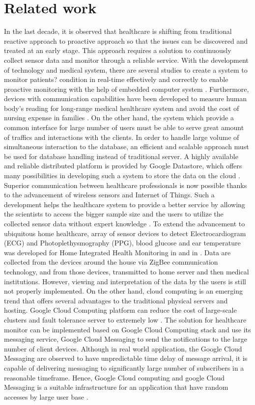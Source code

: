 \section{Related work}
In the last decade, it is observed that healthcare is shifting from traditional reactive approach to proactive approach so
that the issues can be discovered and treated at an early stage. This approach requires a solution to continuously
collect sensor data and monitor through a reliable service.  With the development of technology and medical system,
there are several studies to create a system to monitor patients? condition in real-time effectively and correctly to
enable proactive monitoring \cite{5076774} with the help of embedded computer system \cite{4062461}. Furthermore,
devices with communication capabilities have been developed to measure human body's reading for long-range medical
healthcare system and avoid the cost of nursing expense in families \cite{5918041}. On the other hand, the system which
provide a common interface for large number of users must be able to serve great amount of traffics and interactions
with the clients.  In order to handle large volume of simultaneous interaction to the database, an efficient and
scalable approach must be used for database handling instead of traditional server. A highly available and reliable
distributed platform is provided by Google Datastore, which offers many possibilities in developing such a system to
store the data on the cloud \cite{7059154}.  Superior communication between healthcare professionals is now possible
thanks to the advancement of wireless sensors and Internet of Things. Such a development helps the healthcare system to
provide a better service by allowing the scientists to access the bigger sample size and the users to utilize the
collected sensor data without expert knowledge \cite{7027488}.  To extend the advancement to ubiquitous home
healthcare, array of sensor devices to detect Electrocardiogram (ECG) and Photoplethysmography (PPG), blood glucose
and ear temperature was developed for Home Integrated Health Monitoring in \cite{4352299} and in \cite{5918041}. Data
are collected from the devices around the house via ZigBee communication technology, and from those devices, transmitted
to home server and then medical institutions. However, viewing and interpretation of the data by the users is still not
properly implemented.  On the other hand, cloud computing is an emerging trend that offers several advantages to the
traditional physical servers and hosting. Google Cloud Computing platform can reduce the cost of large-scale clusters
and fault tolerance server to extremely low \cite{5718338}. The solution for healthcare monitor can be implemented
based on Google Cloud Computing stack and use its messaging service, Google Cloud Messaging to send the notifications to
the large number of client devices. Although in real world application, the Google Cloud Messaging are observed to have
unpredictable time delay of message arrival, it is capable of delivering messaging to significantly large number of
subscribers in a reasonable timeframe. Hence, Google Cloud computing and google Cloud Messaging is a suitable
infrastructure for an application that have random accesses by large user base \cite{7037233}.

